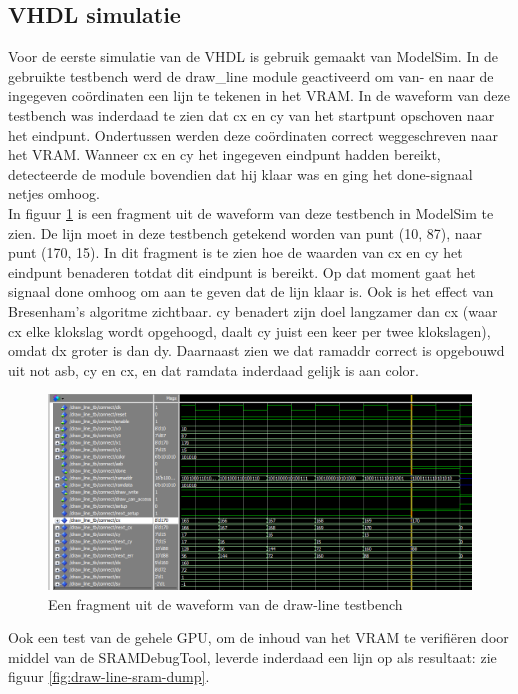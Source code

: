 \documentclass{scrartcl} %
\begin{document}
\subsection{VHDL simulatie}
Voor de eerste simulatie van de VHDL is gebruik gemaakt van ModelSim. In de gebruikte testbench werd de draw\_line module geactiveerd om van- en naar de ingegeven coördinaten een lijn te tekenen in het VRAM. In de waveform van deze testbench was inderdaad te zien dat cx en cy van het startpunt opschoven naar het eindpunt. Ondertussen werden deze coördinaten correct weggeschreven naar het VRAM. Wanneer cx en cy het ingegeven eindpunt hadden bereikt, detecteerde de module bovendien dat hij klaar was en ging het done-signaal netjes omhoog.
\\
In figuur \ref{fig:draw-line-modelsim} is een fragment uit de waveform van deze testbench in ModelSim te zien. De lijn moet in deze testbench getekend worden van punt (10, 87), naar punt (170, 15). In dit fragment is te zien hoe de waarden van cx en cy het eindpunt benaderen totdat dit eindpunt is bereikt. Op dat moment gaat het signaal done omhoog om aan te geven dat de lijn klaar is. Ook is het effect van Bresenham's algoritme zichtbaar. cy benadert zijn doel langzamer dan cx (waar cx elke klokslag wordt opgehoogd, daalt cy juist een keer per twee klokslagen), omdat dx groter is dan dy. Daarnaast zien we dat ramaddr correct is opgebouwd uit not asb, cy en cx, en dat ramdata inderdaad gelijk is aan color.

\begin{figure}[H]
	\centering
	\includegraphics[width=\textwidth]{resource/modelsim.png}
	\caption{Een fragment uit de waveform van de draw-line testbench }
	\label{fig:draw-line-modelsim}
\end{figure}

Ook een test van de gehele GPU, om de inhoud van het VRAM te verifiëren door middel van de SRAMDebugTool, leverde inderdaad een lijn op als resultaat: zie figuur \ref{fig:draw-line-sram-dump}.
\end{document}
